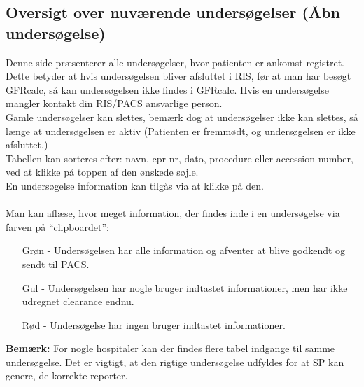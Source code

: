 \documentclass{article}
\begin{document}
\subsection{Oversigt over nuværende undersøgelser (Åbn undersøgelse)}\label{list_study}
Denne side præsenterer alle undersøgelser, hvor patienten er ankomst registret. Dette betyder at hvis undersøgelsen bliver afsluttet i RIS, før at man har besøgt GFRcalc, så kan undersøgelsen ikke findes i GFRcalc. Hvis en undersøgelse mangler kontakt din RIS/PACS ansvarlige person.\\
Gamle undersøgelser kan slettes, bemærk dog at undersøgelser ikke kan slettes, så længe at undersøgelsen er aktiv (Patienten er fremmødt, og undersøgelsen er ikke afsluttet.)\\
Tabellen kan sorteres efter: navn, cpr-nr, dato, procedure eller accession number, ved at klikke på toppen af den ønskede søjle.\\
En undersøgelse information kan tilgås via at klikke på den.\\\\
Man kan aflæse, hvor meget information, der findes inde i en undersøgelse via farven på “clipboardet”:
\begin{itemize}
	\item[Grøn] - Undersøgelsen har alle information og afventer at blive godkendt og sendt til PACS.
	\item[Gul] - Undersøgelsen har nogle bruger indtastet informationer, men har ikke udregnet clearance endnu. 
	\item[Rød] - Undersøgelse har ingen bruger indtastet informationer. 
\end{itemize} 
\textbf{Bemærk:} For nogle hospitaler kan der findes flere tabel indgange til samme undersøgelse. Det er vigtigt, at den rigtige undersøgelse udfyldes for at  SP kan genere, de korrekte reporter.    
\end{document}
